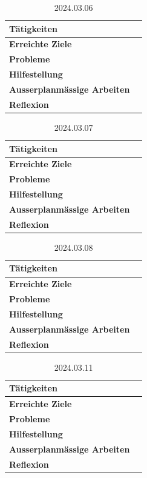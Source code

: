 \documentclass{report}
\begin{document}
\begin{table}[ht]
\caption{2024.03.06}
\begin{tabularx}{\textwidth}{|X|X|}
 \hline
 \textbf{Tätigkeiten} &   \\
 \hline
 \textbf{Erreichte Ziele} &   \\
  \hline
 \textbf{Probleme} &   \\
 \hline
 \textbf{Hilfestellung} &  \\
 \hline
 \textbf{Ausserplanmässige Arbeiten} &   \\
 \hline
 \textbf{Reflexion} &   \\
\hline
\end{tabularx}

\end{table}

\begin{table}[ht]
\caption{2024.03.07}
\begin{tabularx}{\textwidth}{|X|X|}
 \hline
 \textbf{Tätigkeiten} &   \\
 \hline
 \textbf{Erreichte Ziele} &   \\
  \hline
 \textbf{Probleme} &   \\
 \hline
 \textbf{Hilfestellung} &  \\
 \hline
 \textbf{Ausserplanmässige Arbeiten} &   \\
 \hline
 \textbf{Reflexion} &   \\
\hline
\end{tabularx}

\end{table}

\begin{table}[ht]
\caption{2024.03.08}
\begin{tabularx}{\textwidth}{|X|X|}
 \hline
 \textbf{Tätigkeiten} &   \\
 \hline
 \textbf{Erreichte Ziele} &   \\
  \hline
 \textbf{Probleme} &   \\
 \hline
 \textbf{Hilfestellung} &  \\
 \hline
 \textbf{Ausserplanmässige Arbeiten} &   \\
 \hline
 \textbf{Reflexion} &   \\
\hline
\end{tabularx}

\end{table}

\begin{table}[ht]
\caption{2024.03.11}
\begin{tabularx}{\textwidth}{|X|X|}
 \hline
 \textbf{Tätigkeiten} &   \\
 \hline
 \textbf{Erreichte Ziele} &   \\
  \hline
 \textbf{Probleme} &   \\
 \hline
 \textbf{Hilfestellung} &  \\
 \hline
 \textbf{Ausserplanmässige Arbeiten} &   \\
 \hline
 \textbf{Reflexion} &   \\
\hline
\end{tabularx}

\end{table}
\end{document}
